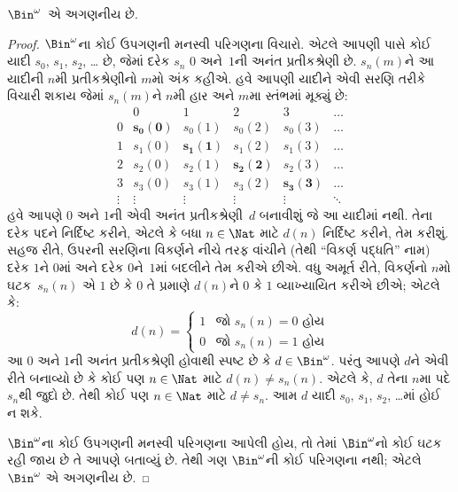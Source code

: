 \begin{thm}
$\Bin^\omega$~એ અગણનીય છે.
\end{thm}

\begin{proof}
$\Bin^\omega$ના કોઈ ઉપગણની મનસ્વી પરિગણના વિચારો. એટલે આપણી પાસે
કોઈ યાદી $s_{0}$, $s_{1}$, $s_{2}$, \dots{} છે, જેમાં દરેક $s_n$
$0$ અને~$1$ની અનંત પ્રતીકશ્રેણી છે. $s_n(m)$ને આ યાદીની $n$મી
પ્રતીકશ્રેણીનો $m$મો અંક કહીએ. હવે આપણી યાદીને એવી સરણિ તરીકે
વિચારી શકાય જેમાં $s_n(m)$ને $n$મી હાર અને $m$મા સ્તંભમાં મૂક્યું છે:
\[
\begin{array}{c|c|c|c|c|c}
& 0 & 1 & 2 & 3 & \dots \\\hline
0 & \mathbf{s_{0}(0)} & s_{0}(1) & s_{0}(2) & s_0(3) & \dots \\\hline
1 & s_{1}(0)& \mathbf{s_{1}(1)} & s_1(2) & s_1(3) & \dots \\\hline
2 & s_{2}(0)& s_{2}(1) & \mathbf{s_2(2)} & s_2(3) & \dots \\\hline
3 & s_{3}(0)& s_{3}(1) & s_3(2) & \mathbf{s_3(3)} & \dots \\\hline
\vdots & \vdots & \vdots & \vdots & \vdots & \mathbf{\ddots}
\end{array}
\]
હવે આપણે $0$ અને $1$ની એવી અનંત પ્રતીકશ્રેણી~$d$ બનાવીશું જે આ
યાદીમાં નથી. તેના દરેક પદને નિર્દિષ્ટ કરીને, એટલે કે બધા
$n \in \Nat$ માટે $d(n)$ નિર્દિષ્ટ કરીને, તેમ કરીશું. સહજ રીતે,
ઉપરની સરણિના વિકર્ણને નીચે તરફ વાંચીને (તેથી “વિકર્ણ પદ્ધતિ” નામ)
દરેક $1$ને $0$માં અને દરેક $0$ને~$1$માં બદલીને તેમ કરીએ છીએ.
વધુ અમૂર્ત રીતે, વિકર્ણનો $n$મો ઘટક~$s_n(n)$ એ $1$ છે કે
$0$ તે પ્રમાણે $d(n)$ને $0$ કે $1$ વ્યાખ્યાયિત કરીએ છીએ; એટલે કે:
\[
d(n) =
\begin{cases}
1 & \text{જો $s_{n}(n) = 0$ હોય}\\
0 & \text{જો $s_{n}(n) = 1$ હોય}
\end{cases}
\]
આ $0$ અને $1$ની અનંત પ્રતીકશ્રેણી હોવાથી સ્પષ્ટ છે કે
$d \in \Bin^\omega$. પરંતુ આપણે $d$ને એવી રીતે બનાવ્યો છે કે
કોઈ પણ $n \in \Nat$ માટે $d(n) \neq s_n(n)$. એટલે કે, $d$ તેના
$n$મા પદે $s_n$થી જુદો છે. તેથી કોઈ પણ $n\in \Nat$ માટે
$d \neq s_n$. આમ $d$ યાદી $s_0$, $s_1$, $s_2$, \dots{}માં હોઈ ન શકે.

$\Bin^\omega$ના કોઈ ઉપગણની મનસ્વી પરિગણના આપેલી હોય, તો તેમાં
$\Bin^\omega$નો કોઈ ઘટક રહી જાય છે તે આપણે બતાવ્યું છે.
તેથી ગણ $\Bin^\omega$ની કોઈ પરિગણના નથી; એટલે $\Bin^\omega$ એ
અગણનીય છે.
\end{proof}

